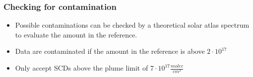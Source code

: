 \documentclass{beamer} %
\begin{document}
			

		\begin{frame}
			\frametitle{\color{mygreen} Checking for contamination\\%
				\color{mygreen}{\rule{0.8\textwidth}{2pt}}}
			\vspace{-0.2cm}
			\begin{itemize}
				\item Possible contaminations can be checked
				by a theoretical solar atlas spectrum to evaluate the  amount in the reference.
				\item Data are contaminated if the  amount in the reference is above $2\cdot 10^{17}$ 
				\item Only accept  SCDs above the plume limit of $7\cdot 10^{17} \frac{molec}{cm^2}$
			\end{itemize}
		\end{frame}
		
\end{document}
